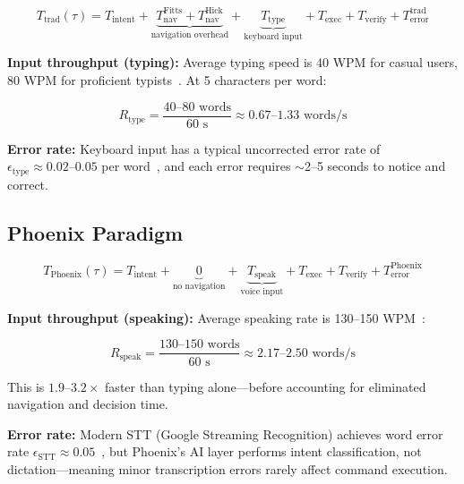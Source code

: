 \documentclass[11pt, a4paper]{article}
\begin{document}
\begin{equation}
  T_{\text{trad}}(\tau) = T_{\text{intent}} + \underbrace{T_{\text{nav}}^{\text{Fitts}} + T_{\text{nav}}^{\text{Hick}}}_{\text{navigation overhead}} + \underbrace{T_{\text{type}}}_{\text{keyboard input}} + T_{\text{exec}} + T_{\text{verify}} + T_{\text{error}}^{\text{trad}}
\end{equation}

\textbf{Input throughput (typing):}
Average typing speed is 40 WPM for casual users, 80 WPM for proficient
typists~\cite{dhakal2018}. At 5 characters per word:

\begin{equation}
  R_{\text{type}} = \frac{40 \text{--} 80 \text{ words}}{60 \text{ s}} \approx 0.67 \text{--} 1.33 \text{ words/s}
\end{equation}

\textbf{Error rate:} Keyboard input has a typical uncorrected error rate of
$\epsilon_{\text{type}} \approx 0.02\text{--}0.05$ per word~\cite{wobbrock2006},
and each error requires $\sim$2--5 seconds to notice and correct.

\subsection{Phoenix Paradigm}

\begin{equation}
  T_{\text{Phoenix}}(\tau) = T_{\text{intent}} + \underbrace{0}_{\text{no navigation}} + \underbrace{T_{\text{speak}}}_{\text{voice input}} + T_{\text{exec}} + T_{\text{verify}} + T_{\text{error}}^{\text{Phoenix}}
\end{equation}

\textbf{Input throughput (speaking):}
Average speaking rate is 130--150 WPM~\cite{williams1998}:

\begin{equation}
  R_{\text{speak}} = \frac{130 \text{--} 150 \text{ words}}{60 \text{ s}} \approx 2.17 \text{--} 2.50 \text{ words/s}
\end{equation}

This is $\mathbf{1.9\text{--}3.2\times}$ faster than typing alone---before
accounting for eliminated navigation and decision time.

\textbf{Error rate:} Modern STT (Google Streaming Recognition) achieves word
error rate $\epsilon_{\text{STT}} \approx 0.05$~\cite{google2023}, but Phoenix's AI
layer performs intent classification, not dictation---meaning minor transcription
errors rarely affect command execution.
\end{document}
